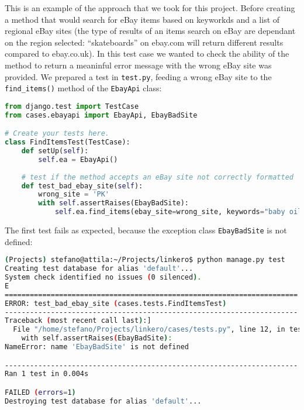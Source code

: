 This is an example of the approach that we took for this project. Before
creating a method that would search for eBay items based on keyworkds and
a list of regional eBay sites (the type of results of an items search on eBay
are dependant on the region selected: ``skateboards'' on ebay.com will return
different results compared to ebay.co.uk). In this test case we wanted to check
the ability of the method to return a meaninful error message with the wrong
eBay site was provided. We prepared a test in \texttt{test.py}, feeding a wrong
eBay site to the \texttt{find\_items()} method of the \texttt{EbayApi} class:
\begin{lstlisting}[language=Python, breaklines=true]
from django.test import TestCase
from cases.ebayapi import EbayApi, EbayBadSite

# Create your tests here.
class FindItemsTest(TestCase):
    def setUp(self):
        self.ea = EbayApi()
    
    # test if the method accepts an eBay site not correctly formatted
    def test_bad_ebay_site(self):
        wrong_site = 'PK'
        with self.assertRaises(EbayBadSite):
            self.ea.find_items(ebay_site=wrong_site, keywords="baby oil")
\end{lstlisting}

The first test fails as expected, because the exception class
\texttt{EbayBadSite} is not defined:
\begin{lstlisting}[language=bash, breaklines=true]
(Projects) stefano@attila:~/Projects/linkero$ python manage.py test
Creating test database for alias 'default'...
System check identified no issues (0 silenced).
E
======================================================================
ERROR: test_bad_ebay_site (cases.tests.FindItemsTest)
----------------------------------------------------------------------
Traceback (most recent call last):]
  File "/home/stefano/Projects/linkero/cases/tests.py", line 12, in test_bad_ebay_site
    with self.assertRaises(EbayBadSite):
NameError: name 'EbayBadSite' is not defined

----------------------------------------------------------------------
Ran 1 test in 0.004s

FAILED (errors=1)
Destroying test database for alias 'default'...
\end{lstlisting}

